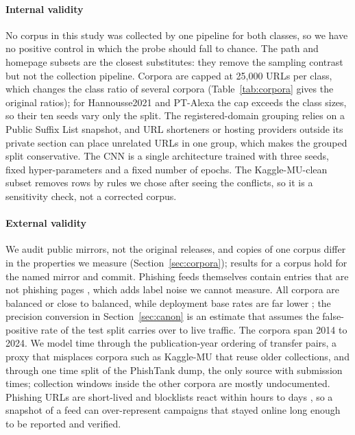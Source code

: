 \paragraph{Internal validity} No corpus in this study was collected by one pipeline for both classes, so we have no positive control in which the probe should fall to chance. The path and homepage subsets are the closest substitutes: they remove the sampling contrast but not the collection pipeline. Corpora are capped at 25,000 URLs per class, which changes the class ratio of several corpora (Table~\ref{tab:corpora} gives the original ratios); for Hannousse2021 and PT-Alexa the cap exceeds the class sizes, so their ten seeds vary only the split. The registered-domain grouping relies on a Public Suffix List snapshot, and URL shorteners or hosting providers outside its private section can place unrelated URLs in one group, which makes the grouped split conservative. The CNN is a single architecture trained with three seeds, fixed hyper-parameters and a fixed number of epochs. The Kaggle-MU-clean subset removes rows by rules we chose after seeing the conflicts, so it is a sensitivity check, not a corrected corpus.

\paragraph{External validity} We audit public mirrors, not the original releases, and copies of one corpus differ in the properties we measure (Section~\ref{sec:corpora}); results for a corpus hold for the named mirror and commit. Phishing feeds themselves contain entries that are not phishing pages \citep{marchal2018}, which adds label noise we cannot measure. All corpora are balanced or close to balanced, while deployment base rates are far lower \citep{marchal2018,dalton2025}; the precision conversion in Section~\ref{sec:canon} is an estimate that assumes the false-positive rate of the test split carries over to live traffic. The corpora span 2014 to 2024. We model time through the publication-year ordering of transfer pairs, a proxy that misplaces corpora such as Kaggle-MU that reuse older collections, and through one time split of the PhishTank dump, the only source with submission times; collection windows inside the other corpora are mostly undocumented. Phishing URLs are short-lived and blocklists react within hours to days \citep{oest2020phishtime,oest2020sunrise}, so a snapshot of a feed can over-represent campaigns that stayed online long enough to be reported and verified.
